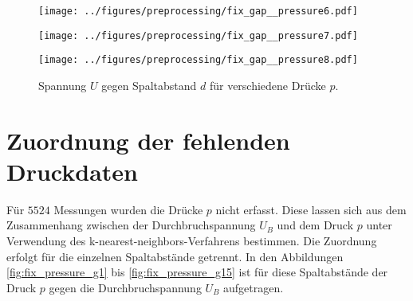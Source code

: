 \begin{figure}[htbp]
    \begin{minipage}[t]{0.32\textwidth}
        \centering
        \texttt{[image: ../figures/preprocessing/fix\_gap\_\_pressure6.pdf]}
        \caption{p = \SIrange{5}{6}{\milli\bar}}
        \label{fig:fix_gap_p5}
    \end{minipage}\hfill
    \begin{minipage}[t]{0.32\textwidth}
        \centering
        \texttt{[image: ../figures/preprocessing/fix\_gap\_\_pressure7.pdf]}
        \caption{p = \SIrange{6}{7}{\milli\bar}}
        \label{fig:fix_gap_p6}
    \end{minipage}\hfill
    \begin{minipage}[t]{0.32\textwidth}
        \centering
        \texttt{[image: ../figures/preprocessing/fix\_gap\_\_pressure8.pdf]}
        \caption{p = \SIrange{7}{8}{\milli\bar}}
        \label{fig:fix_gap_p7}
    \end{minipage}

    \caption{Spannung \( U \) gegen Spaltabstand \( d \) für verschiedene Drücke \( p \).}
    \label{fig:fix_gap_all}
\end{figure}

  
\section{Zuordnung der fehlenden Druckdaten}
\label{sec:setpressure}
Für \(5524\) Messungen wurden die Drücke \(p\) nicht erfasst. Diese lassen sich aus dem Zusammenhang zwischen der Durchbruchspannung \(U_B\) und dem Druck \(p\) unter Verwendung des k-nearest-neighbors-Verfahrens bestimmen. Die Zuordnung erfolgt für die einzelnen Spaltabstände getrennt. In den Abbildungen \ref{fig:fix_pressure_g1} bis \ref{fig:fix_pressure_g15} ist für diese Spaltabstände der Druck \(p\) gegen die Durchbruchspannung \(U_B\) aufgetragen. 


